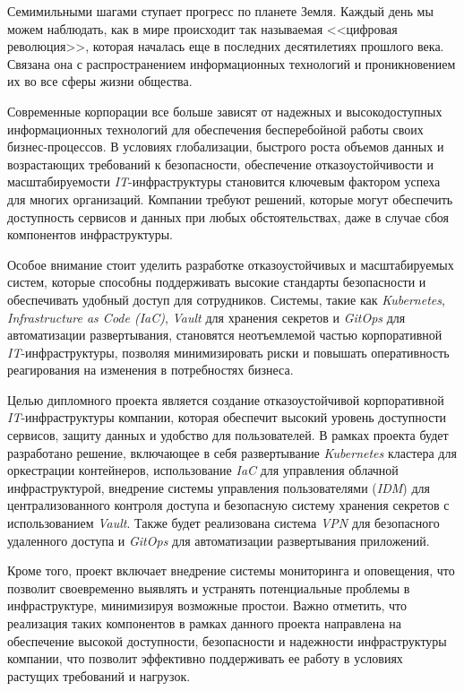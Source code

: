 \label{sec:intro}

Семимильными шагами ступает прогресс по планете Земля. Каждый день мы можем наблюдать, как в мире происходит так называемая <<цифровая революция>>, которая началась еще в последних десятилетиях прошлого века. Связана она с распространением информационных технологий и проникновением их во все сферы жизни общества.

Современные корпорации все больше зависят от надежных и высокодоступных информационных технологий для обеспечения бесперебойной работы своих бизнес-процессов. В условиях глобализации, быстрого роста объемов данных и возрастающих требований к безопасности, обеспечение отказоустойчивости и масштабируемости \textit{IT}-инфраструктуры становится ключевым фактором успеха для многих организаций. Компании требуют решений, которые могут обеспечить доступность сервисов и данных при любых обстоятельствах, даже в случае сбоя компонентов инфраструктуры.

Особое внимание стоит уделить разработке отказоустойчивых и масштабируемых систем, которые способны поддерживать высокие стандарты безопасности и обеспечивать удобный доступ для сотрудников. Системы, такие как \textit{Kubernetes}, \textit{Infrastructure as Code (IaC)}, \textit{Vault} для хранения секретов и \textit{GitOps} для автоматизации развертывания, становятся неотъемлемой частью корпоративной \textit{IT}-инфраструктуры, позволяя минимизировать риски и повышать оперативность реагирования на изменения в потребностях бизнеса.

Целью дипломного проекта является создание отказоустойчивой корпоративной \textit{IT}-инфраструктуры компании, которая обеспечит высокий уровень доступности сервисов, защиту данных и удобство для пользователей. В рамках проекта будет разработано решение, включающее в себя развертывание \textit{Kubernetes} кластера для оркестрации контейнеров, использование \textit{IaC} для управления облачной инфраструктурой, внедрение системы управления пользователями (\textit{IDM}) для централизованного контроля доступа и безопасную систему хранения секретов с использованием \textit{Vault}. Также будет реализована система \textit{VPN} для безопасного удаленного доступа и \textit{GitOps} для автоматизации развертывания приложений.

Кроме того, проект включает внедрение системы мониторинга и оповещения, что позволит своевременно выявлять и устранять потенциальные проблемы в инфраструктуре, минимизируя возможные простои. Важно отметить, что реализация таких компонентов в рамках данного проекта направлена на обеспечение высокой доступности, безопасности и надежности инфраструктуры компании, что позволит эффективно поддерживать ее работу в условиях растущих требований и нагрузок.

